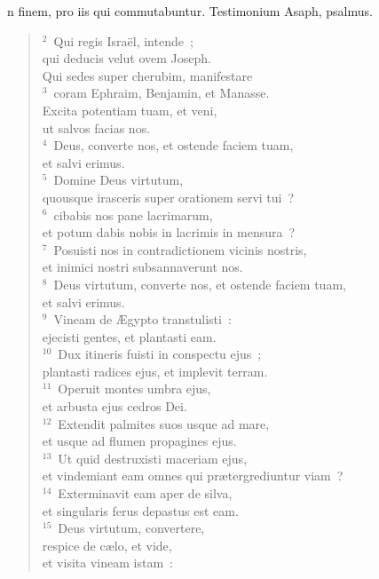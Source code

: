 \bchapter
{}n finem, pro iis qui commutabuntur. Testimonium Asaph, psalmus.
\begin{flushleft}\begin{verse}\vspace{6pt}${}^{2}$~Qui regis Isra\"el, intende~;\\ qui deducis velut ovem Joseph.\\ Qui sedes super cherubim, manifestare\\
${}^{3}$~coram Ephraim, Benjamin, et Manasse.\\ Excita potentiam tuam, et veni,\\ ut salvos facias nos.\\
${}^{4}$~Deus, converte nos, et ostende faciem tuam,\\ et salvi erimus.\\
${}^{5}$~Domine Deus virtutum,\\ quousque irasceris super orationem servi tui~?\\
${}^{6}$~cibabis nos pane lacrimarum,\\ et potum dabis nobis in lacrimis in mensura~?\\
${}^{7}$~Posuisti nos in contradictionem vicinis nostris,\\ et inimici nostri subsannaverunt nos.\\
${}^{8}$~Deus virtutum, converte nos, et ostende faciem tuam,\\ et salvi erimus.\\
${}^{9}$~Vineam de \AE gypto transtulisti~:\\ ejecisti gentes, et plantasti eam.\\
${}^{10}$~Dux itineris fuisti in conspectu ejus~;\\ plantasti radices ejus, et implevit terram.\\
${}^{11}$~Operuit montes umbra ejus,\\ et arbusta ejus cedros Dei.\\
${}^{12}$~Extendit palmites suos usque ad mare,\\ et usque ad flumen propagines ejus.\\
${}^{13}$~Ut quid destruxisti maceriam ejus,\\ et vindemiant eam omnes qui pr\ae tergrediuntur viam~?\\
${}^{14}$~Exterminavit eam aper de silva,\\ et singularis ferus depastus est eam.\\
${}^{15}$~Deus virtutum, convertere,\\ respice de c\ae lo, et vide,\\ et visita vineam istam~:\\

\end{verse}
\end{flushleft}

